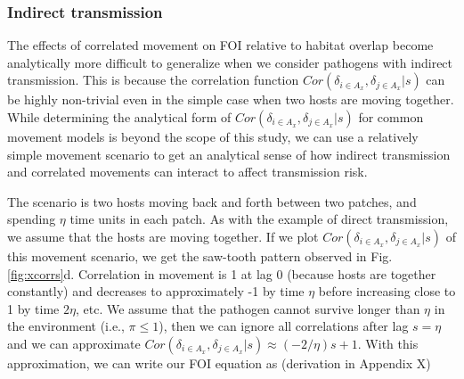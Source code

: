 \documentclass[letterpaper]{article}
\begin{document}
\subsubsection*{Indirect transmission}

The effects of correlated movement on FOI relative to habitat overlap become analytically more difficult to generalize when we consider pathogens with indirect transmission.  This is because the correlation function $Cor(\delta_{i \in A_x}, \delta_{j \in A_x} | s)$ can be highly non-trivial even in the simple case when two hosts are moving together.  
While determining the analytical form of $Cor(\delta_{i \in A_x}, \delta_{j \in A_x} | s)$ for common movement models is beyond the scope of this study, we can use a relatively simple movement scenario to get an analytical sense of how indirect transmission and correlated movements can interact to affect transmission risk.

The scenario is two hosts moving back and forth between two patches, and spending $\eta$ time units in each patch.  As with the example of direct transmission, we assume that the hosts are moving together. If we plot $Cor(\delta_{i \in A_x}, \delta_{j \in A_x} | s)$ of this movement scenario, we get the saw-tooth pattern observed in Fig. \ref{fig:xcorrs}d.  
Correlation in movement is 1 at lag 0 (because hosts are together constantly) and decreases to approximately -1 by time $\eta$ before increasing close to 1 by time $2\eta$, etc. %
We assume that the pathogen cannot survive longer than $\eta$ in the environment (i.e., $\pi \leq 1$), then we can ignore all correlations after lag $s = \eta$ and we can approximate $Cor(\delta_{i \in A_x}, \delta_{j \in A_x} | s) \approx (-2 / \eta)s + 1$.  With this approximation, we can write our FOI equation as (derivation in Appendix X)
\end{document}
